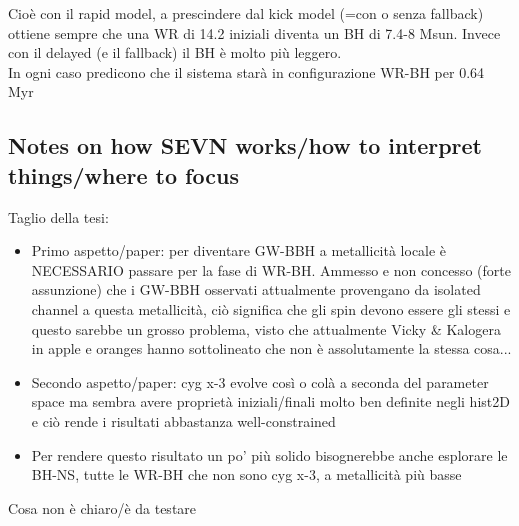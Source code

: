 \documentclass[a4paper,titlepage]{book}     	%
\begin{document}
Cioè con il rapid model, a prescindere dal kick model (=con o senza fallback) ottiene sempre che una WR di 14.2 iniziali diventa un BH di 7.4-8 Msun. Invece con il delayed (e il fallback) il BH è molto più leggero.\\

In ogni caso predicono che il sistema starà in configurazione WR-BH per 0.64 Myr

\subsection{Notes on how SEVN works/how to interpret things/where to focus}
Taglio della tesi: 
\begin{itemize}
	\item Primo aspetto/paper: per diventare GW-BBH a metallicità locale è NECESSARIO passare per la fase di WR-BH. Ammesso e non concesso (forte assunzione) che i GW-BBH osservati attualmente provengano da isolated channel a questa metallicità, ciò significa che gli spin devono essere gli stessi e questo sarebbe un grosso problema, visto che attualmente Vicky \& Kalogera in apple e oranges hanno sottolineato che non è assolutamente la stessa cosa...
	\item Secondo aspetto/paper: cyg x-3 evolve così o colà a seconda del parameter space ma sembra avere proprietà iniziali/finali molto ben definite negli hist2D e ciò rende i risultati abbastanza well-constrained
	\item Per rendere questo risultato un po' più solido bisognerebbe anche esplorare le BH-NS, tutte le WR-BH che non sono cyg x-3, a metallicità più basse
\end{itemize}

Cosa non è chiaro/è da testare
\end{document}
